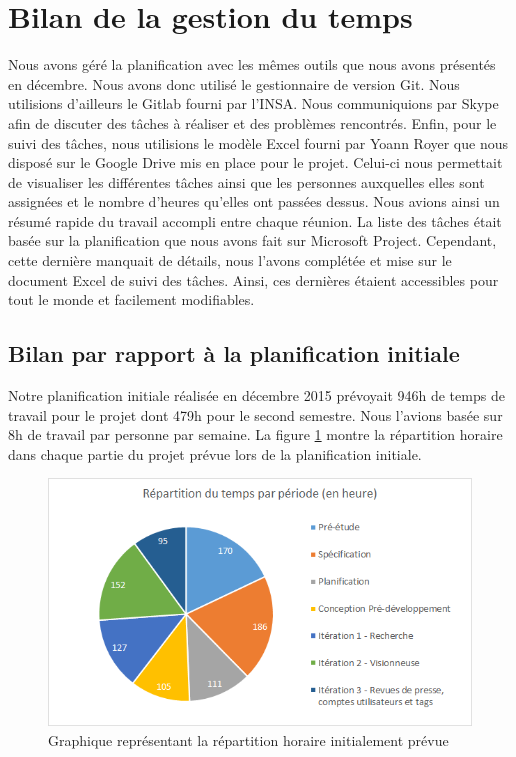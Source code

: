 \section{Bilan de la gestion du temps}
\label{sec:time}

Nous avons géré la planification avec les mêmes outils que nous avons présentés en décembre. Nous avons donc utilisé le gestionnaire de version Git. Nous utilisions d'ailleurs le Gitlab fourni par l'INSA. Nous communiquions par Skype afin de discuter des tâches à réaliser et des problèmes rencontrés. Enfin, pour le suivi des tâches, nous utilisions le modèle Excel fourni par Yoann Royer que nous disposé sur le Google Drive mis en place pour le projet. Celui-ci nous permettait de visualiser les différentes tâches ainsi que les personnes auxquelles elles sont assignées et le nombre d'heures qu'elles ont passées dessus. Nous avions ainsi un résumé rapide du travail accompli entre chaque réunion. La liste des tâches était basée sur la planification que nous avons fait sur Microsoft Project. Cependant, cette dernière manquait de détails, nous l'avons complétée et mise sur le document Excel de suivi des tâches. Ainsi, ces dernières étaient accessibles pour tout le monde et facilement modifiables. 

\subsection{Bilan par rapport à la planification initiale}

Notre planification initiale réalisée en décembre 2015 prévoyait 946h de temps de travail pour le projet dont 479h pour le second semestre. Nous l'avions basée sur 8h de travail par personne par semaine. La figure \ref{CamFirst} montre la répartition horaire dans chaque partie du projet prévue lors de la planification initiale.

    \begin{figure}[H]
        \centering
        \includegraphics[width=\textwidth]{figure/camembertfirst.png}
            \caption{Graphique représentant la répartition horaire initialement prévue}
            \label{CamFirst}
    \end{figure}

